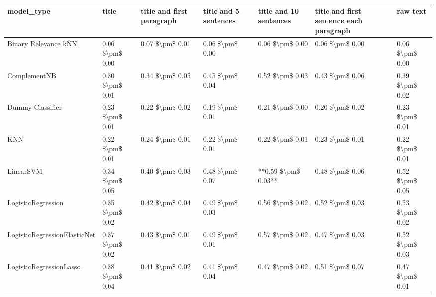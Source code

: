 \begin{tabular}{lllllll}
\toprule
                     model\_type &           title & title and first paragraph & title and 5 sentences & title and 10 sentences & title and first sentence each paragraph &        raw text \\
\midrule
           Binary Relevance kNN & 0.06 \$\textbackslash pm\$ 0.00 &           0.07 \$\textbackslash pm\$ 0.01 &       0.06 \$\textbackslash pm\$ 0.00 &        0.06 \$\textbackslash pm\$ 0.00 &                         0.06 \$\textbackslash pm\$ 0.00 & 0.06 \$\textbackslash pm\$ 0.00 \\
                   ComplementNB & 0.30 \$\textbackslash pm\$ 0.01 &           0.34 \$\textbackslash pm\$ 0.05 &       0.45 \$\textbackslash pm\$ 0.04 &        0.52 \$\textbackslash pm\$ 0.03 &                         0.43 \$\textbackslash pm\$ 0.06 & 0.39 \$\textbackslash pm\$ 0.02 \\
               Dummy Classifier & 0.23 \$\textbackslash pm\$ 0.01 &           0.22 \$\textbackslash pm\$ 0.02 &       0.19 \$\textbackslash pm\$ 0.01 &        0.21 \$\textbackslash pm\$ 0.00 &                         0.20 \$\textbackslash pm\$ 0.02 & 0.23 \$\textbackslash pm\$ 0.01 \\
                            KNN & 0.22 \$\textbackslash pm\$ 0.01 &           0.24 \$\textbackslash pm\$ 0.01 &       0.22 \$\textbackslash pm\$ 0.01 &        0.22 \$\textbackslash pm\$ 0.01 &                         0.23 \$\textbackslash pm\$ 0.01 & 0.22 \$\textbackslash pm\$ 0.01 \\
                      LinearSVM & 0.34 \$\textbackslash pm\$ 0.05 &           0.40 \$\textbackslash pm\$ 0.03 &       0.48 \$\textbackslash pm\$ 0.07 &    **0.59 \$\textbackslash pm\$ 0.03** &                         0.48 \$\textbackslash pm\$ 0.06 & 0.52 \$\textbackslash pm\$ 0.05 \\
             LogisticRegression & 0.35 \$\textbackslash pm\$ 0.02 &           0.42 \$\textbackslash pm\$ 0.04 &       0.49 \$\textbackslash pm\$ 0.03 &        0.56 \$\textbackslash pm\$ 0.02 &                         0.52 \$\textbackslash pm\$ 0.03 & 0.53 \$\textbackslash pm\$ 0.02 \\
   LogisticRegressionElasticNet & 0.37 \$\textbackslash pm\$ 0.02 &           0.43 \$\textbackslash pm\$ 0.01 &       0.49 \$\textbackslash pm\$ 0.01 &        0.57 \$\textbackslash pm\$ 0.02 &                         0.47 \$\textbackslash pm\$ 0.03 & 0.52 \$\textbackslash pm\$ 0.03 \\
        LogisticRegressionLasso & 0.38 \$\textbackslash pm\$ 0.04 &           0.41 \$\textbackslash pm\$ 0.02 &       0.41 \$\textbackslash pm\$ 0.04 &        0.47 \$\textbackslash pm\$ 0.02 &                         0.51 \$\textbackslash pm\$ 0.07 & 0.47 \$\textbackslash pm\$ 0.01 \\

\end{tabular}
